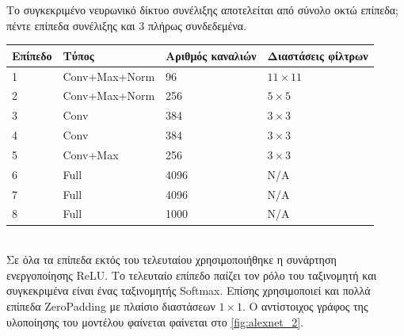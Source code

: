 Το συγκεκριμένο νευρωνικό δίκτυο συνέλιξης αποτελείται από σύνολο οκτώ επίπεδα;
πέντε επίπεδα συνέλιξης και 3 πλήρως συνδεδεμένα. \\

\begin{tabular}{ | l | l | l | l | }
  \hline
  \rowcolor{Gray}
  Επίπεδο  & Τύπος & Αριθμός καναλιών & Διαστάσεις φίλτρων \\
  \hline
  1 & Conv+Max+Norm & 96 & $11 \times 11$ \\
  2 & Conv+Max+Norm & 256 & $5 \times 5$ \\
  3 & Conv & 384 & $3 \times 3$ \\
  4 & Conv & 384 & $3 \times 3$ \\
  5 & Conv+Max & 256 & $3 \times 3$ \\
  6 & Full & 4096 & Ν/A \\
  7 & Full & 4096 & N/A \\
  8 & Full & 1000 & N/A \\
  \hline
\end{tabular}
\\

Σε όλα τα επίπεδα εκτός του τελευταίου χρησιμοποιήθηκε η συνάρτηση ενεργοποίησης
ReLU. Το τελευταίο επίπεδο παίζει τον ρόλο του ταξινομητή και συγκεκριμένα
είναι ένας ταξινομητής Softmax.
Επίσης χρησιμοποιεί και πολλά επίπεδα ZeroPadding με πλαίσιο
διαστάσεων $1 \times 1$. Ο αντίστοιχος γράφος της υλοποίησης του μοντέλου
φαίνεται φαίνεται στο \autoref{fig:alexnet_2}.

